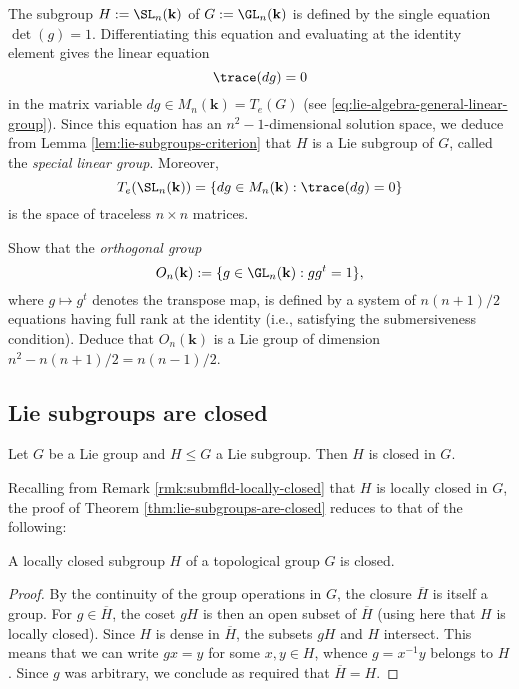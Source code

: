 \documentclass[reqno]{amsart} 
\begin{document}
\begin{example}
  The subgroup $H := \SL_n(\mathbf{k})$ of $G :=
  \GL_n(\mathbf{k})$
  is defined by the single equation $\det(g) = 1$.
  Differentiating this equation and evaluating
  at the identity element gives the linear equation
  \begin{equation*}
  \trace(d g) = 0
  \end{equation*}
  in the matrix variable $d g \in M_n(\mathbf{k}) = T_e(G)$ (see \eqref{eq:lie-algebra-general-linear-group}).
  Since this equation has an $n^2-1$-dimensional solution space,
  we deduce from Lemma \ref{lem:lie-subgroups-criterion}
  that $H$ is a Lie subgroup
  of $G$, called the \emph{special linear group}.
  Moreover,
  \begin{equation*}
  T_e(\SL_n(\mathbf{k}))
  = \{d g \in M_n(\mathbf{k}) : \trace(d g) = 0\}
  \end{equation*}
  is the space of traceless $n \times n$ matrices.
\end{example}

\begin{exercise}
  Show that the \emph{orthogonal group}
  \begin{equation*}
  O_n(\mathbf{k}) := \{g \in \GL_n(\mathbf{k}) : g g^t =
  1\},
  \end{equation*}
  where $g \mapsto g^t$ denotes the transpose map,
  is defined
  by a system of $n(n+1)/2$ equations 
  having full rank at the identity 
  (i.e., satisfying the submersiveness condition).
  Deduce that $O_n(\mathbf{k})$ is a Lie group
  of dimension $n^2 - n(n+1)/2 = n(n-1)/2$.
\end{exercise}

\subsection{Lie subgroups are closed\label{sec:lie-subgroups-are-closed}}
\label{sec:orgc0ef6df}
\begin{theorem}\label{thm:lie-subgroups-are-closed}
 Let $G$ be a Lie group and $H \leq G$ a Lie subgroup.  Then $H$
is closed in $G$.  
\end{theorem}
Recalling from Remark \ref{rmk:submfld-locally-closed} 
that $H$ is locally closed in $G$,
the proof of Theorem \ref{thm:lie-subgroups-are-closed} reduces  to that of the following:
\begin{lemma}
  A locally closed
subgroup $H$ of a topological group $G$ is closed. 
\end{lemma}
\begin{proof}
   By
the continuity of the group operations in $G$, the closure $\overline{H}$ is itself a group.
For
$g \in \overline{H}$, the coset $g H$ is then an open subset of
$\overline{H}$ (using here that $H$ is locally closed).  Since $H$ is dense in $\overline{H}$, the
subsets $g H$ and $H$ intersect.  This means that we can write
$g x = y$ for some $x,y \in H$, whence $g = x^{-1} y$ belongs to
$H$.  Since $g$ was arbitrary, we conclude as required that
$\overline{H} = H$.
\end{proof}
\end{document}
